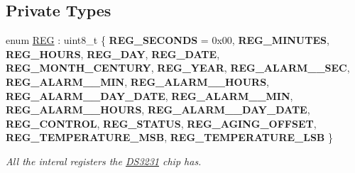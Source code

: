 \subsection*{Private Types}
\begin{DoxyCompactItemize}
\item 
\mbox{\label{class_d_s3231_a0b898a5f3a0c06bc6a6d8fb94d34dd02}} 
enum \mbox{\hyperlink{class_d_s3231_a0b898a5f3a0c06bc6a6d8fb94d34dd02}{R\+EG}} \+: uint8\+\_\+t \{ \newline
{\bfseries R\+E\+G\+\_\+\+S\+E\+C\+O\+N\+DS} = 0x00, 
{\bfseries R\+E\+G\+\_\+\+M\+I\+N\+U\+T\+ES}, 
{\bfseries R\+E\+G\+\_\+\+H\+O\+U\+RS}, 
{\bfseries R\+E\+G\+\_\+\+D\+AY}, 
\newline
{\bfseries R\+E\+G\+\_\+\+D\+A\+TE}, 
{\bfseries R\+E\+G\+\_\+\+M\+O\+N\+T\+H\+\_\+\+C\+E\+N\+T\+U\+RY}, 
{\bfseries R\+E\+G\+\_\+\+Y\+E\+AR}, 
{\bfseries R\+E\+G\+\_\+\+A\+L\+A\+R\+M\+\_\+\_\+\+S\+EC}, 
\newline
{\bfseries R\+E\+G\+\_\+\+A\+L\+A\+R\+M\+\_\+\_\+\+M\+IN}, 
{\bfseries R\+E\+G\+\_\+\+A\+L\+A\+R\+M\+\_\+\_\+\+H\+O\+U\+RS}, 
{\bfseries R\+E\+G\+\_\+\+A\+L\+A\+R\+M\+\_\+\_\+\+D\+A\+Y\+\_\+\+D\+A\+TE}, 
{\bfseries R\+E\+G\+\_\+\+A\+L\+A\+R\+M\+\_\+\_\+\+M\+IN}, 
\newline
{\bfseries R\+E\+G\+\_\+\+A\+L\+A\+R\+M\+\_\+\_\+\+H\+O\+U\+RS}, 
{\bfseries R\+E\+G\+\_\+\+A\+L\+A\+R\+M\+\_\+\_\+\+D\+A\+Y\+\_\+\+D\+A\+TE}, 
{\bfseries R\+E\+G\+\_\+\+C\+O\+N\+T\+R\+OL}, 
{\bfseries R\+E\+G\+\_\+\+S\+T\+A\+T\+US}, 
\newline
{\bfseries R\+E\+G\+\_\+\+A\+G\+I\+N\+G\+\_\+\+O\+F\+F\+S\+ET}, 
{\bfseries R\+E\+G\+\_\+\+T\+E\+M\+P\+E\+R\+A\+T\+U\+R\+E\+\_\+\+M\+SB}, 
{\bfseries R\+E\+G\+\_\+\+T\+E\+M\+P\+E\+R\+A\+T\+U\+R\+E\+\_\+\+L\+SB}
 \}
\begin{DoxyCompactList}\small\item\em All the interal registers the \mbox{\hyperlink{class_d_s3231}{D\+S3231}} chip has. \end{DoxyCompactList}\end{DoxyCompactItemize}
